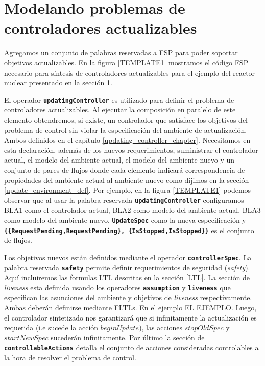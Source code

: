 \section{Modelando problemas de controladores actualizables}

Agregamos un conjunto de palabras reservadas a FSP para poder soportar objetivos actualizables. En la figura
\ref{TEMPLATE1} mostramos el código FSP necesario para síntesis de controladores actualizables para el ejemplo del reactor nuclear
presentado en la sección \ref{}.

El operador \texttt{\textbf{updatingController}} es utilizado para definir el problema de controladores
actualizables. Al ejecutar la composición en paralelo de este elemento obtendremos, si existe, un controlador que satisface los
objetivos del problema de control sin violar la especificación del ambiente de actualización. Ambos definidos en el
capítulo \ref{updating_controller_chapter}. Necesitamos en esta declaración, además de los nuevos requerimientos, suministrar
el controlador actual, el modelo del ambiente actual, el modelo del ambiente nuevo y un conjunto de pares de flujos
donde cada elemento indicará correspondencia de propiedades del ambiente actual al ambiente nuevo como dijimos en la sección
\ref{update_environment_def}. Por ejemplo, en la figura \ref{TEMPLATE1} podemos observar que
al usar la palabra reservada \texttt{\textbf{updatingController}} configuramos BLA1 como el controlador actual, BLA2
como modelo del ambiente actual, BLA3 como modelo del ambiente nuevo, \texttt{\textbf{UpdateSpec}} como la nueva
especificación y \texttt{\textbf{\{\{RequestPending,RequestPending\}, \{IsStopped,IsStopped\}\}}} es el conjunto de
flujos.

Los objetivos nuevos están definidos mediante el operador \texttt{\textbf{controllerSpec}}. La palabra reservada
\texttt{\textbf{safety}} permite definir requerimientos de seguridad (\emph{safety}). Aquí incluiremos las formulas
LTL descritas en la sección \ref{LTL}. La sección de \emph{liveness} esta definida usando los operadores \texttt{\textbf{assumption}} y
\texttt{\textbf{liveness}} que especifican las asunciones del ambiente y objetivos de \emph{liveness} respectivamente.
Ambas deberán definirse mediante FLTLs. En el ejemplo EL EJEMPLO. Luego, el controlador sintetizado nos garantizará que
si infinitamente la actualización es requerida (i.e sucede la acción $beginUpdate$), las acciones $stopOldSpec$ y
$startNewSpec$ sucederán infinitamente. Por último la sección de \texttt{\textbf{controllableActions}} detalla el
conjunto de acciones consideradas controlables a la hora de resolver el problema de control.

